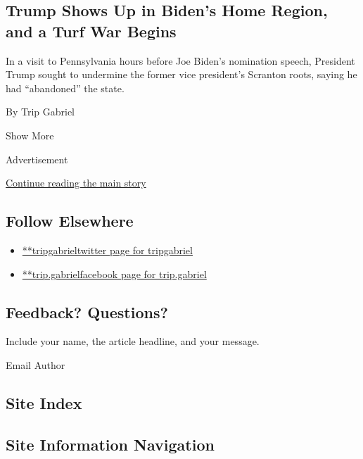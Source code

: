 \begin{enumerate}
  \hypertarget{trump-shows-up-in-bidens-home-region-and-a-turf-war-begins}{%
  \subsection{Trump Shows Up in Biden's Home Region, and a Turf War
  Begins}\label{trump-shows-up-in-bidens-home-region-and-a-turf-war-begins}}

  In a visit to Pennsylvania hours before Joe Biden's nomination speech,
  President Trump sought to undermine the former vice president's
  Scranton roots, saying he had ``abandoned'' the state.

  By Trip Gabriel
\end{enumerate}

Show More

Advertisement

\protect\hyperlink{after-mid2}{Continue reading the main story}

\hypertarget{follow-elsewhere}{%
\subsection{Follow Elsewhere}\label{follow-elsewhere}}

\begin{itemize}
\tightlist
\item
  \href{https://twitter.com/tripgabriel}{**tripgabrieltwitter page for
  tripgabriel}
\item
  \href{https://www.facebookcorewwwi.onion/trip.gabriel}{**trip.gabrielfacebook
  page for trip.gabriel}
\end{itemize}

\hypertarget{feedback-questions}{%
\subsection{Feedback? Questions?}\label{feedback-questions}}

Include your name, the article headline, and your message.

Email Author

\hypertarget{site-index}{%
\subsection{Site Index}\label{site-index}}

\hypertarget{site-information-navigation}{%
\subsection{Site Information
Navigation}\label{site-information-navigation}}

